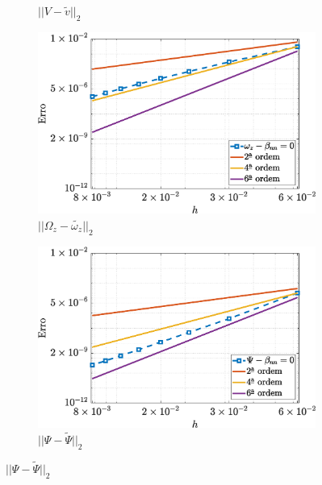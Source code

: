 \begin{figure}[H]
\begin{subfigure}[b]{.47\textwidth}
            \caption{$||V - \widetilde{v}||_{2}$}
            \label{error_v_2nd_Case1_ucm}
        \end{subfigure}
        \qquad
        \begin{subfigure}[b]{.47\textwidth}
            \includegraphics[width=\textwidth]{figures/Case12/UCM/Errors/NormErr_2nd_Re_100_Wi_1_epsilon_0_xi_0_alphaG_0_Dt_1e-06_at_0.05_tipsim_1_MMS_12_Wz.eps}
            \caption{$||\Omega_{z} - \widetilde{\omega_{z}}||_{2}$}
            \label{error_wz_2nd_Case1_ucm}
        \end{subfigure}
        \vspace{0.02cm}
        \qquad
        \begin{subfigure}[b]{.47\textwidth}
            \includegraphics[width=\textwidth]{figures/Case12/UCM/Errors/NormErr_2nd_Re_100_Wi_1_epsilon_0_xi_0_alphaG_0_Dt_1e-06_at_0.05_tipsim_1_MMS_12_Psi.eps}
            \caption{$||\Psi - \widetilde{\Psi}||_{2}$}
            \label{error_psi_2nd_Case1_ucm}
        \end{subfigure}
        \fdadospesquisa
\end{figure}

